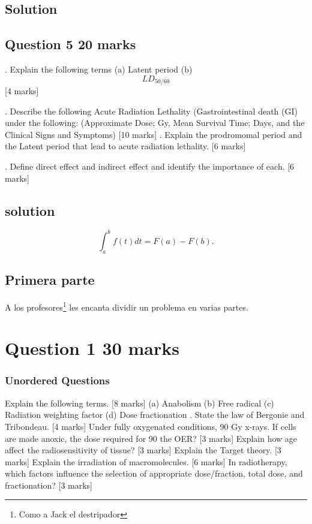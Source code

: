 \documentclass{assignment}
\begin{document}
\begin{problem}
\subsection{Solution}
\subsection*{Question 5 20 marks}
. Explain the following terms (a) Latent period (b) \begin{equation}
    LD_{50/60}
\end{equation}[4 marks]

. Describe the following Acute Radiation Lethality (Gastrointestinal death (GI) under the following:
(Approximate Dose; Gy, Mean Survival Time; Days, and the Clinical Signs and Symptoms) [10 marks]
. Explain the prodromomal period and the Latent period that lead to acute radiation lethality. [6 marks]

. Define direct effect and indirect effect and identify the importance of each. [6 marks]
\subsection{solution}

\begin{equation}\label{eq:TeoremaFundamental}
    \int_a^b f(t)dt = F(a)-F(b).
\end{equation}
\subsection{Primera parte}

\noindent A los profesores\footnote{Como a Jack el destripador} les encanta dividir un problema en varias partes.
\section*{Question 1 30 marks}
\subsubsection*{Unordered Questions}
 Explain the following terms. [8 marks]
(a) Anabolism (b) Free radical
(c) Radiation weighting factor (d) Dose fractionation
. State the law of Bergonie and Tribondeau. [4 marks]
\noindent Under fully oxygenated conditions, 90 %
Gy x-rays. If cells are made anoxic, the dose required for 90%
the OER? [3 marks]
\noindent Explain how age affect the radiosensitivity of tissue? [3 marks]
\noindent Explain the Target theory. [3 marks]
\noindent Explain the irradiation of macromolecules. [6 marks]
\noindent In radiotherapy, which factors influence the selection of appropriate dose/fraction, total
dose, and fractionation? [3 marks]

\end{problem}
\end{document}
